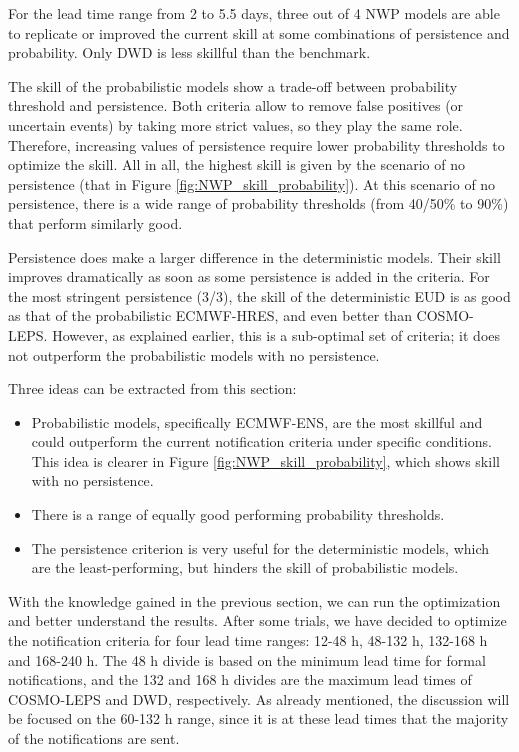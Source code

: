 \documentclass[preprint,12pt]{elsarticle}
\begin{document}
For the lead time range from 2 to 5.5 days, three out of 4 NWP models are able to replicate or improved the current skill at some combinations of persistence and probability. Only DWD is less skillful than the benchmark.

The skill of the probabilistic models show a trade-off between probability threshold and persistence. Both criteria allow to remove false positives (or uncertain events) by taking more strict values, so they play the same role. Therefore, increasing values of persistence require lower probability thresholds to optimize the skill. All in all, the highest skill is given by the scenario of no persistence (that in Figure \ref{fig:NWP_skill_probability}). At this scenario of no persistence, there is a wide range of probability thresholds (from 40/50\% to 90\%) that perform similarly good.

Persistence does make a larger difference in the deterministic models. Their skill improves dramatically as soon as some persistence is added in the criteria. For the most stringent persistence (3/3), the skill of the deterministic EUD is as good as that of the probabilistic ECMWF-HRES, and even better than COSMO-LEPS. However, as explained earlier, this is a sub-optimal set of criteria; it does not outperform the probabilistic models with no persistence.

Three ideas can be extracted from this section:
\begin{itemize}
    \item Probabilistic models, specifically ECMWF-ENS, are the most skillful and could outperform the current notification criteria under specific conditions. This idea is clearer in Figure \ref{fig:NWP_skill_probability}, which shows skill with no persistence.
    \item There is a range of equally good performing probability thresholds.
    \item The persistence criterion is very useful for the deterministic models, which are the least-performing, but hinders the skill of probabilistic models.
\end{itemize}

With the knowledge gained in the previous section, we can run the optimization and better understand the results. After some trials, we have decided to optimize the notification criteria for four lead time ranges: 12-48 h, 48-132 h, 132-168 h and 168-240 h. The 48 h divide is based on the minimum lead time for formal notifications, and the 132 and 168 h divides are the maximum lead times of COSMO-LEPS and DWD, respectively. As already mentioned, the discussion will be focused on the 60-132 h range, since it is at these lead times that the majority of the notifications are sent.
\end{document}
